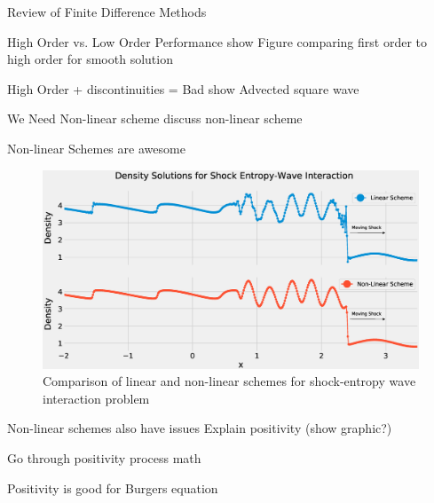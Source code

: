 \documentclass[9pt]{beamer}
\begin{document}
\begin{frame}{Review of Finite Difference Methods}
  
\end{frame}


\begin{frame}{High Order vs. Low Order Performance}
  show Figure comparing first order to high order for smooth solution
\end{frame}

\begin{frame}{High Order + discontinuities = Bad}
  show Advected square wave
\end{frame}


\begin{frame}{We Need Non-linear scheme}
  discuss non-linear scheme
\end{frame}


\begin{frame}{Non-linear Schemes are awesome}
  \begin{figure}[H]
    \centering
    \includegraphics[scale=0.25]{DensitySolutions.eps}\caption{Comparison of linear and non-linear schemes for shock-entropy wave interaction problem}
      \label{fig:ShockEntropy}
    \end{figure}
\end{frame}

\begin{frame}{Non-linear schemes also have issues}
  Explain positivity (show graphic?)
\end{frame}

\begin{frame}{Go through positivity process}
 math
\end{frame}

\begin{frame}{Positivity is good for Burgers equation}
  
\end{frame}
\end{document}
